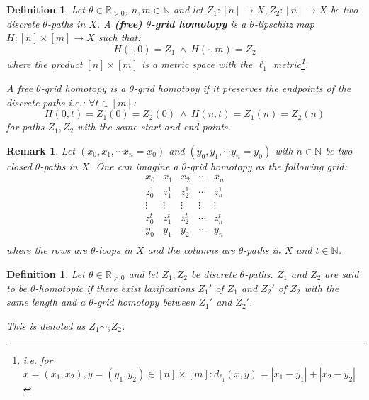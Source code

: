 \documentclass[a4paper, 11pt, twoside]{article}
\newcommand{\R}[0]{\mathbb{R}}
\newcommand{\N}[0]{\mathbb{N}}
\theoremstyle{break}
\theoremstyle{break}
\newtheorem{defin}[thm]{Definition}
\newtheorem{rem}[thm]{Remark}
\begin{document}
\begin{defin}
  Let $\theta \in \R_{>0}$, $n,m \in \N$ and let $Z_1: [n] \to X, Z_2: [n] \to X$ be two discrete $\theta$-paths in $X$. 
  A \textbf{(free) $\theta$-grid homotopy} is a $\theta$-lipschitz map $H: [n] \times [m] \to X$ such that:
  \begin{equation*}
    H(\cdot, 0) = Z_1 \: \land \: H(\cdot, m) = Z_2
  \end{equation*}
  where the product $[n] \times [m]$ is a metric space with the $\ell_1$ metric\footnote{i.e. for $x = (x_1, x_2), y = (y_1, y_2) \in [n] \times [m]: d_{\ell_1}(x, y) = |x_1 - y_1| + |x_2 - y_2|$}.

  A free $\theta$-grid homotopy is a $\theta$-grid homotopy if it preserves the endpoints of the discrete paths i.e.: $\forall t\in [m]$:
  \begin{equation*}
    H(0,t) = Z_1(0) = Z_2(0) \: \land \: H(n,t) = Z_1(n) = Z_2(n)
  \end{equation*}
  for paths $Z_1, Z_2$ with the same start and end points. 
\end{defin}

\begin{rem}
  Let $(x_0, x_1, \cdots x_n = x_0)$ and $(y_0, y_1, \cdots y_n = y_0)$ with $n \in \N$ be two closed $\theta$-paths in $X$. 
  One can imagine a $\theta$-grid homotopy as the following grid:
  \begin{equation*}
    \begin{matrix}
      x_0 & x_1 & x_2 & \cdots & x_n \\
      z_0^1 & z_1^1 & z_2^1 & \cdots & z_n^1 \\
      \vdots & \vdots & \vdots & \vdots & \vdots \\
      z_0^{t} & z_1^{t} & z_2^{t} & \cdots & z_n^{t} \\
      y_0 & y_1 & y_2 & \cdots & y_n \\
    \end{matrix}
  \end{equation*}
  where the rows are $\theta$-loops in $X$ and the columns are $\theta$-paths in $X$ and $t\in \N$.
\end{rem}

\begin{defin}
  Let $\theta \in \R_{>0}$ and let $Z_1, Z_2$ be discrete $\theta$-paths. $Z_1$ and $Z_2$ are said to be $\theta$-homotopic 
  if there exist lazifications $Z_1'$ of $Z_1$ and $Z_2'$ of $Z_2$ with the same length and a $\theta$-grid homotopy between $Z_1'$ and $Z_2'$.
  
  This is denoted as $Z_1 \sim_{\theta} Z_2$.
\end{defin}
\end{document}
